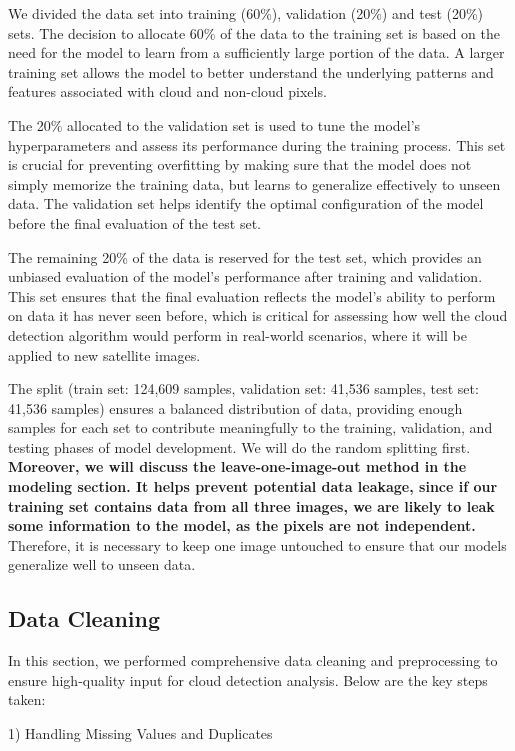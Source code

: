 \documentclass[10pt,letterpaper]{article}
\begin{document}
We divided the data set into training (60\%), validation (20\%) and test (20\%) sets. The decision to allocate 60\% of the data to the training set is based on the need for the model to learn from a sufficiently large portion of the data. A larger training set allows the model to better understand the underlying patterns and features associated with cloud and non-cloud pixels.

The 20\% allocated to the validation set is used to tune the model's hyperparameters and assess its performance during the training process. This set is crucial for preventing overfitting by making sure that the model does not simply memorize the training data, but learns to generalize effectively to unseen data. The validation set helps identify the optimal configuration of the model before the final evaluation of the test set.

The remaining 20\% of the data is reserved for the test set, which provides an unbiased evaluation of the model's performance after training and validation. This set ensures that the final evaluation reflects the model’s ability to perform on data it has never seen before, which is critical for assessing how well the cloud detection algorithm would perform in real-world scenarios, where it will be applied to new satellite images.

The split (train set: 124,609 samples, validation set: 41,536 samples, test set: 41,536 samples) ensures a balanced distribution of data, providing enough samples for each set to contribute meaningfully to the training, validation, and testing phases of model development. We will do the random splitting first. \textbf{Moreover, we will discuss the leave-one-image-out method in the modeling section. It helps prevent potential data leakage, since if our training set contains data from all three images, we are likely to leak some information to the model, as the pixels are not independent.} Therefore, it is necessary to keep one image untouched to ensure that our models generalize well to unseen data.

\subsection{Data Cleaning}

In this section, we performed comprehensive data cleaning and preprocessing to ensure high-quality input for cloud detection analysis. Below are the key steps taken:

1) Handling Missing Values and Duplicates
\end{document}
